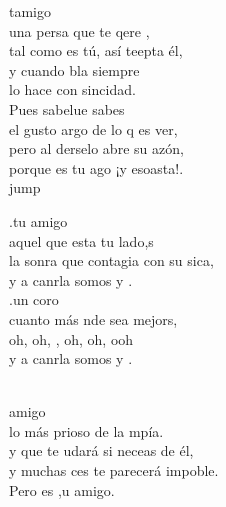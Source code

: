 \begin{cancion}[Es tu amigo es][Kairoi]%
	 tamigo  \\
	una persa que te qere ,  \\
	tal como es tú, así teepta él, \\
	y cuando bla siempre \\
	lo hace con sincidad.\\
	Pues sabelue sabes  \\
	el gusto argo de lo q es ver,\\
	pero al derselo abre su azón,  \\
	porque es tu ago ¡y esoasta!.\\jump\\
	\begin{chorus}%
	.tu amigo  \\
	aquel que esta tu lado,s \\
	la sonra que contagia con su sica,\\
	y a canrla somos  y .\\
	.un coro  \\
	cuanto más nde sea mejors, \\
	oh, oh, , oh, oh,  ooh \\
	y a canrla somos  y .  \\
	\end{chorus}%
	\jump\\
	  amigo  \\
	lo más prioso de la mpía. \\
	y que te udará si neceas de él,\\
	y muchas ces te parecerá impoble.\\
	Pero es ,u amigo. \\

\end{cancion}
